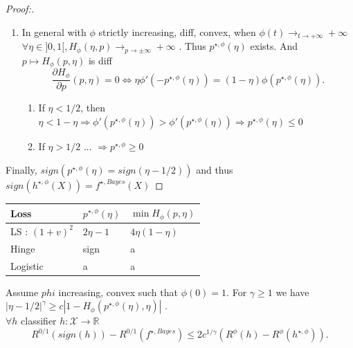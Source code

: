 \begin{proof}[Proof:]
\begin{enumerate}
        \item In general with $ \phi  $ strictly increasing, diff, convex, when $ \phi (t) \to _{t \to +\infty } + \infty $  $ \forall \eta \in ]0, 1[, H_\phi (\eta , p) \to _{p \to  \pm \infty } + \infty $ . Thus $ p^{\star , \phi }(\eta ) $ exists. And $ p \mapsto H_\phi (p, \eta ) $ is diff 
        \[
            \frac{\partial H_{\phi }}{\partial p} (p , \eta ) = 0 \Leftrightarrow \eta \phi ' (-p^{\star , \phi }(\eta )) = (1 - \eta ) \phi (p^{\star , \phi } (\eta )) 
        .\]
        \begin{enumerate}
            \item If $ \eta < 1/2 $, then $ \eta < 1 - \eta \Rightarrow  \phi ' ( p^{\star , \phi } (\eta )) > \phi ' (p^{\star , \phi } (\eta )) \Rightarrow  p^{\star , \phi } ( \eta ) \leq 0$ 
            \item If $ \eta > 1/2 $ ... $ \Rightarrow p^{\star , \phi } \geq 0 $ 
        \end{enumerate}
    \end{enumerate}
    Finally, $ sign(p^{\star , \phi } ( \eta ) = sign( \eta - 1/2) ) $ and thus $ sign(h^{\star , \phi } (X) ) = f^{\star , Bayes } (X)$  

\end{proof}

\begin{table}[!ht]
    \centering
    \begin{tabular}{|l|l|l|}
    \hline
        Loss & $ p^{\star , \phi }(\eta ) $  & $ \min H_\phi (p, \eta ) $  \\ \hline
        LS : $ (1 + v)^2 $  & $ 2 \eta - 1 $  & $ 4 \eta (1 - \eta )  $  \\ \hline
        Hinge & sign & a \\ \hline
        Logistic & a & a \\ \hline
    \end{tabular}
    \label{table:loss}
\end{table}


\begin{lem}[Zhang]
    Assume $ phi $ increasing, convex such that $ \phi (0) = 1 $. For $ \gamma \geq 1 $ we have $ \left| \eta  - 1/2 \right|^\gamma  \geq c \left| 1 - H_\phi (p^{\star , \phi }(\eta ), \eta ) \right|   $ . \\
    $ \forall h $ classifier $ h: \mathcal{X} \to \mathbb{R} $ 
    \[
        R^{0/1} (sign(h)) - R^{0/1}(f^{\star , Bayes}) \leq 2 c ^{1/\gamma }(R^\phi (h) - R^\phi (h^{\star , \phi }))
    .\]
\end{lem}

